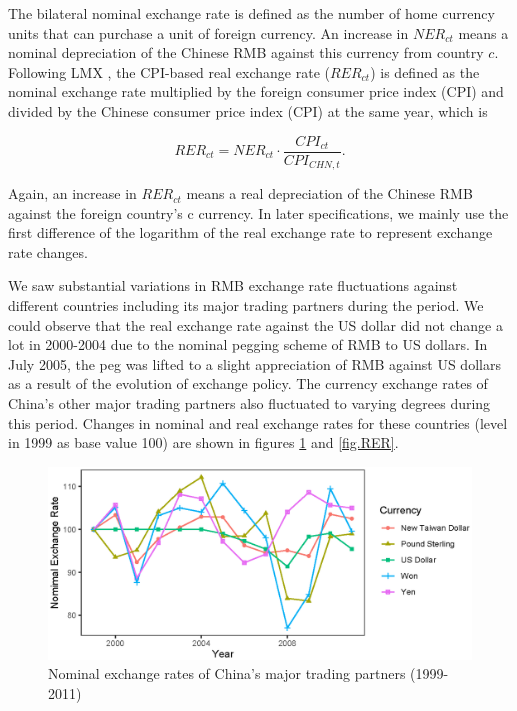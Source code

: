 \documentclass[12pt]{article}
\begin{document}
The bilateral nominal exchange rate is defined as the number of home currency units that can purchase a unit of foreign currency. An increase in $NER_{ct}$ means a nominal depreciation of the Chinese RMB against this currency from country $c$. Following LMX \cite{lmx2015}, the CPI-based real exchange rate ($RER_{ct}$) is defined as the nominal exchange rate multiplied by the foreign consumer price index (CPI) and divided by the Chinese consumer price index (CPI) at the same year, which is

$$
RER_{ct}=NER_{ct} \cdot \frac{CPI_{ct}}{CPI_{CHN,t}}.
$$

Again, an increase in $RER_{ct}$ means a real depreciation of the Chinese RMB against the foreign country's c currency. In later specifications, we mainly use the first difference of the logarithm of the real exchange rate to represent exchange rate changes.

We saw substantial variations in RMB exchange rate fluctuations against different countries including its major trading partners during the period. We could observe that the real exchange rate against the US dollar did not change a lot in 2000-2004 due to the nominal pegging scheme of RMB to US dollars. In July 2005, the peg was lifted to a slight appreciation of RMB against US dollars as a result of the evolution of exchange policy. The currency exchange rates of China's other major trading partners also fluctuated to varying degrees during this period. Changes in nominal and real exchange rates for these countries (level in 1999 as base value 100) are shown in figures \ref{fig.NER} and \ref{fig.RER}.

\begin{figure}[htbp]
	\centering
	\includegraphics[width=1\textwidth]{figure/figure1.eps}
	\caption{Nominal exchange rates of China's major trading partners (1999-2011)}
	\label{fig.NER}
\end{figure}
\end{document}
